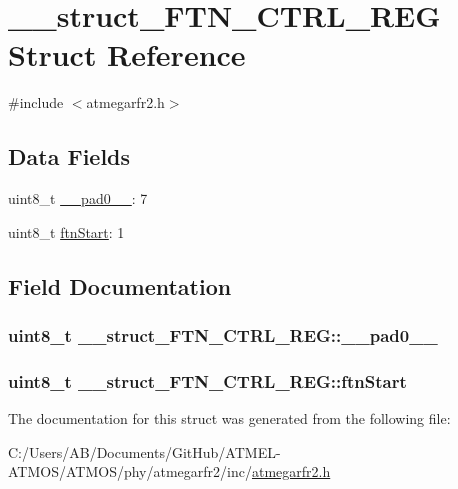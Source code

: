 \hypertarget{struct____struct___f_t_n___c_t_r_l___r_e_g}{\section{\-\_\-\-\_\-struct\-\_\-\-F\-T\-N\-\_\-\-C\-T\-R\-L\-\_\-\-R\-E\-G Struct Reference}
\label{struct____struct___f_t_n___c_t_r_l___r_e_g}
}


{\ttfamily \#include $<$atmegarfr2.\-h$>$}

\subsection*{Data Fields}
\begin{DoxyCompactItemize}
\item 
uint8\-\_\-t \hyperlink{struct____struct___f_t_n___c_t_r_l___r_e_g_a17217216d88173c59bf208f39b3da751}{\-\_\-\-\_\-pad0\-\_\-\-\_\-}\-: 7
\item 
uint8\-\_\-t \hyperlink{struct____struct___f_t_n___c_t_r_l___r_e_g_a208a772690f3f013f181bd528010da2a}{ftn\-Start}\-: 1
\end{DoxyCompactItemize}


\subsection{Field Documentation}
\hypertarget{struct____struct___f_t_n___c_t_r_l___r_e_g_a17217216d88173c59bf208f39b3da751}{
\subsubsection[{\-\_\-\-\_\-pad0\-\_\-\-\_\-}]{\setlength{\rightskip}{0pt plus 5cm}uint8\-\_\-t \-\_\-\-\_\-struct\-\_\-\-F\-T\-N\-\_\-\-C\-T\-R\-L\-\_\-\-R\-E\-G\-::\-\_\-\-\_\-pad0\-\_\-\-\_\-}}\label{struct____struct___f_t_n___c_t_r_l___r_e_g_a17217216d88173c59bf208f39b3da751}
\hypertarget{struct____struct___f_t_n___c_t_r_l___r_e_g_a208a772690f3f013f181bd528010da2a}{
\subsubsection[{ftn\-Start}]{\setlength{\rightskip}{0pt plus 5cm}uint8\-\_\-t \-\_\-\-\_\-struct\-\_\-\-F\-T\-N\-\_\-\-C\-T\-R\-L\-\_\-\-R\-E\-G\-::ftn\-Start}}\label{struct____struct___f_t_n___c_t_r_l___r_e_g_a208a772690f3f013f181bd528010da2a}


The documentation for this struct was generated from the following file\-:\begin{DoxyCompactItemize}
\item 
C\-:/\-Users/\-A\-B/\-Documents/\-Git\-Hub/\-A\-T\-M\-E\-L-\/\-A\-T\-M\-O\-S/\-A\-T\-M\-O\-S/phy/atmegarfr2/inc/\hyperlink{atmegarfr2_8h}{atmegarfr2.\-h}\end{DoxyCompactItemize}
